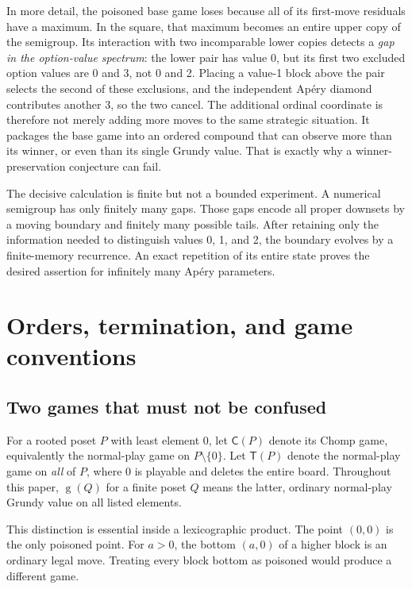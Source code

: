 \documentclass[11pt,letterpaper]{article}
\numberwithin{equation}{section}
\theoremstyle{definition}
\theoremstyle{remark}
\newcommand{\sg}{\operatorname{g}}
\newcommand{\Ch}{\mathsf C}
\newcommand{\Norm}{\mathsf T}
\begin{document}
In more detail, the poisoned base game loses because all of its first-move
residuals have a maximum. In the square, that maximum becomes an entire
upper copy of the semigroup. Its interaction with two incomparable lower
copies detects a \emph{gap in the option-value spectrum}: the lower pair
has value 0, but its first two excluded option values are 0 and 3, not 0
and 2. Placing a value-1 block above the pair selects the second of these
exclusions, and the independent Ap\'ery diamond contributes another 3, so
the two cancel. The additional ordinal coordinate is therefore not merely
adding more moves to the same strategic situation. It packages the base
game into an ordered compound that can observe more than its winner, or
even than its single Grundy value. That is exactly why a
winner-preservation conjecture can fail.

The decisive calculation is finite but not a bounded experiment. A
numerical semigroup has only finitely many gaps. Those gaps encode all
proper downsets by a moving boundary and finitely many possible tails.
After retaining only the information needed to distinguish values
0, 1, and 2, the boundary evolves by a finite-memory recurrence.
An exact repetition of its entire state proves the desired assertion
for infinitely many Ap\'ery parameters.

\section{Orders, termination, and game conventions}\label{sec:orders}

\subsection{Two games that must not be confused}

For a rooted poset $P$ with least element 0, let $\Ch(P)$ denote its
Chomp game, equivalently the normal-play game on $P\setminus\{0\}$.
Let $\Norm(P)$ denote the normal-play game on \emph{all} of $P$, where
0 is playable and deletes the entire board. Throughout this paper,
$\sg(Q)$ for a finite poset $Q$ means the latter, ordinary normal-play
Grundy value on all listed elements.

This distinction is essential inside a lexicographic product. The
point $(0,0)$ is the only poisoned point. For $a>0$, the bottom
$(a,0)$ of a higher block is an ordinary legal move. Treating every
block bottom as poisoned would produce a different game.
\end{document}
